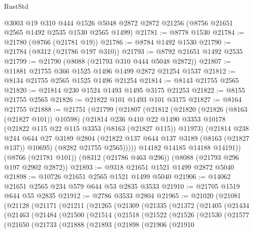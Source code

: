 \begin{lexlean}{RustStd}
\begin{coremodule}
    @3003
    @19
    @310
    @444
    @1526
    @5048
    @2872
    @2872
    @21256
    (@8756 @21651 @2565 @1492 @2535 @1530 @2565 @1499)
@21781 := @8778 @1530
@21784 := @21780 (@8766 (@21781 @19))
@21786 := @8784 @1492 @1530
@21790 := @21784 (@8312 (@21786 @197 @310))
@21793 := @8792 @21651 @1492 @2535
@21799 := @21790 (@8088 (@21793 @310 @444 @5048 @2872))
@21807 := @11881 @21755 @366 @1525 @1496 @1499 @2872 @21254 @1537
@21812 := @8134 @21755 @2565 @1525 @1496 @21254
@21814 := @8143 @21755 @2565
@21820 := @21814 @230 @1524 @1493 @1495 @3175 @21253
@21822 := @8155 @21755 @2565
@21826 := @21822 @101 @1493 @101 @3175
@21827 := @8164 @21755
@21888 := @21751
    (@21799
      (@21807
        (@21812
          (@21820
            (@21826 (@8163 (@21827 @101)) @10598)
            (@21814
              @236
              @410
              @22
              @1490
              @3353
              @10178
              (@21822 @115 @22 @115 @3353 (@8163 (@21827 @115)) @11973)
              (@21814
                @238
                @244
                @644
                @27
                @3189
                @2804
                (@21822 @137 @644 @137 @3189 (@8163 (@21827 @137)) @10695)
                (@8282 @21755 @2565)))))
        @14182
        @14185
        @14188
        @14191))
    (@8766 (@21781 @101))
    (@8312 (@21786 @463 @296))
    (@8088 (@21793 @296 @197 @2902 @2872))
@21893 := @9318 @21651 @1521 @1499 @2872 @5040
@21898 := @10726 @21651 @2565 @1521 @1499 @5040
@21906 := @14062 @21651 @2565 @234 @579 @644 @53 @2835 @3533
@21910 := @21705 @1519 @644 @55 @2835
@21912 := @2786 @3533 @2804
@21965 := @21020
    (@21081
      (@21128
        (@21171
          (@21211
            (@21265
              (@21309
                (@21335
                  (@21372
                    (@21405
                      (@21434
                        (@21463
                          (@21484
                            (@21500
                              (@21514
                                (@21518
                                  (@21522
                                    (@21526
                                      (@21530
                                        (@21577
                                          (@21650
                                            (@21733
                                              (@21888
                                                (@21893
                                                  (@21898
                                                    (@21906
                                                      (@21910

\end{coremodule}
\end{lexlean}
